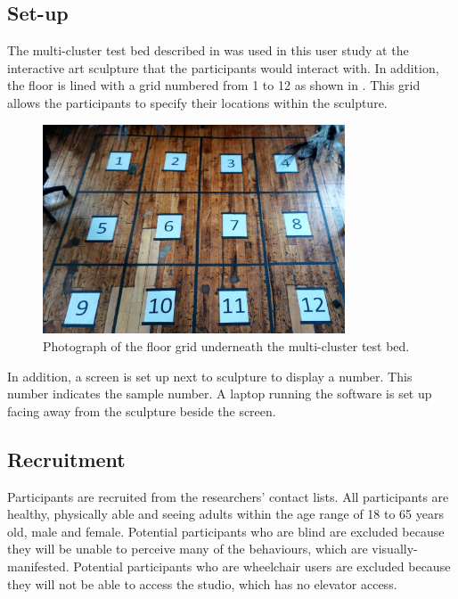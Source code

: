 \subsection{Set-up}

The multi-cluster test bed described in  was used in this user study at the interactive art sculpture that the participants would interact with. In addition, the floor is lined with a grid numbered from 1 to 12 as shown in . This grid allows the participants to specify their locations within the sculpture.  

\begin{figure} [!htbp]
	\centering
	\includegraphics[width=0.8\textwidth]{"fig/validations/cbla-test-bed gird photo"}
	\caption[Photograph of the floor grid underneath the multi-cluster test bed]{Photograph of the floor grid underneath the multi-cluster test bed.}
	\label{fig:cbla-test-bed gird photo}
\end{figure}

In addition, a screen is set up next to sculpture to display a number. This number indicates the sample number. A laptop running the software is set up facing away from the sculpture beside the screen. 


\subsection{Recruitment}

Participants are recruited from the researchers' contact lists. All participants are healthy, physically able and seeing adults within the age range of 18 to 65 years old, male and female. Potential participants who are blind are excluded because they will be unable to perceive many of the behaviours, which are visually-manifested. Potential participants who are wheelchair users are excluded because they will not be able to access the studio, which has no elevator access.

